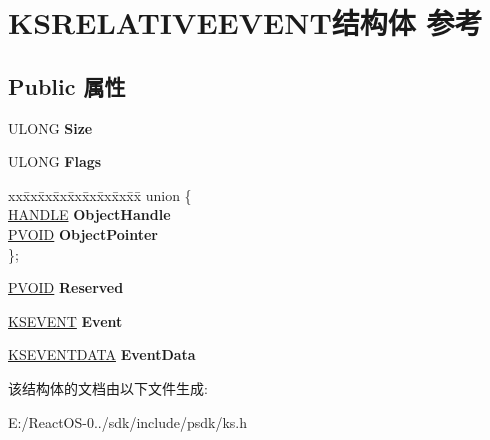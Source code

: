 \hypertarget{struct_k_s_r_e_l_a_t_i_v_e_e_v_e_n_t}{}\section{K\+S\+R\+E\+L\+A\+T\+I\+V\+E\+E\+V\+E\+N\+T结构体 参考}
\label{struct_k_s_r_e_l_a_t_i_v_e_e_v_e_n_t}
\subsection*{Public 属性}
\begin{DoxyCompactItemize}
\item 
\mbox{\label{struct_k_s_r_e_l_a_t_i_v_e_e_v_e_n_t_a4f2b373b6251ad6f8fac52676c94a430}} 
U\+L\+O\+NG {\bfseries Size}
\item 
\mbox{\label{struct_k_s_r_e_l_a_t_i_v_e_e_v_e_n_t_ad139d9b8be7a60c347ba6ca839c220fa}} 
U\+L\+O\+NG {\bfseries Flags}
\item 
\mbox{\label{struct_k_s_r_e_l_a_t_i_v_e_e_v_e_n_t_aba79ea23425438428e631ada0f352185}} 
\begin{tabbing}
xx\=xx\=xx\=xx\=xx\=xx\=xx\=xx\=xx\=\kill
union \{\\
\>\hyperlink{interfacevoid}{HANDLE} {\bfseries ObjectHandle}\\
\>\hyperlink{interfacevoid}{PVOID} {\bfseries ObjectPointer}\\
\}; \\

\end{tabbing}\item 
\mbox{\label{struct_k_s_r_e_l_a_t_i_v_e_e_v_e_n_t_a86e6d25d595e9871a1a4895760ea4276}} 
\hyperlink{interfacevoid}{P\+V\+O\+ID} {\bfseries Reserved}
\item 
\mbox{\label{struct_k_s_r_e_l_a_t_i_v_e_e_v_e_n_t_a832cb6010891364ea88339705304aeab}} 
\hyperlink{struct_k_s_i_d_e_n_t_i_f_i_e_r}{K\+S\+E\+V\+E\+NT} {\bfseries Event}
\item 
\mbox{\label{struct_k_s_r_e_l_a_t_i_v_e_e_v_e_n_t_aad34baa168c003862cc7ad87f41520a4}} 
\hyperlink{struct_k_s_e_v_e_n_t_d_a_t_a}{K\+S\+E\+V\+E\+N\+T\+D\+A\+TA} {\bfseries Event\+Data}
\end{DoxyCompactItemize}


该结构体的文档由以下文件生成\+:\begin{DoxyCompactItemize}
\item 
E\+:/\+React\+O\+S-\/0../sdk/include/psdk/ks.\+h\end{DoxyCompactItemize}

